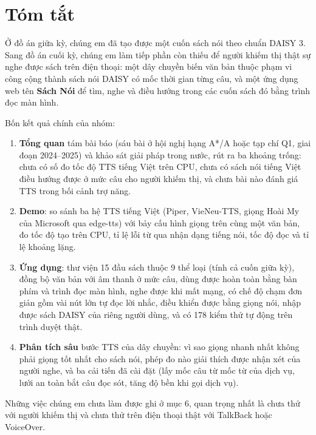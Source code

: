 \documentclass[12pt,a4paper]{article}
\providecommand{\tightlist}{\setlength{\itemsep}{2pt}\setlength{\parskip}{0pt}}
\begin{document}
\section*{Tóm tắt}

Ở đồ án giữa kỳ, chúng em đã tạo được một cuốn sách nói theo chuẩn DAISY 3. Sang đồ án cuối kỳ, chúng em làm tiếp phần còn thiếu để người khiếm thị thật sự nghe được sách trên điện thoại: một dây chuyền biến văn bản thuộc phạm vi công cộng thành sách nói DAISY có mốc thời gian từng câu, và một ứng dụng web tên \textbf{Sách Nói} để tìm, nghe và điều hướng trong các cuốn sách đó bằng trình đọc màn hình.

Bốn kết quả chính của nhóm:

\begin{enumerate}
\def\labelenumi{\arabic{enumi}.}
\tightlist
\item
  \textbf{Tổng quan} tám bài báo (sáu bài ở hội nghị hạng A*/A hoặc tạp chí Q1, giai đoạn 2024--2025) và khảo sát giải pháp trong nước, rút ra ba khoảng trống: chưa có số đo tốc độ TTS tiếng Việt trên CPU, chưa có sách nói tiếng Việt điều hướng được ở mức câu cho người khiếm thị, và chưa bài nào đánh giá TTS trong bối cảnh trợ năng.
\item
  \textbf{Demo}: so sánh ba hệ TTS tiếng Việt (Piper, VieNeu-TTS, giọng Hoài My của Microsoft qua edge-tts) với bảy cấu hình giọng trên cùng một văn bản, đo tốc độ tạo trên CPU, tỉ lệ lỗi từ qua nhận dạng tiếng nói, tốc độ đọc và tỉ lệ khoảng lặng.
\item
  \textbf{Ứng dụng}: thư viện 15 đầu sách thuộc 9 thể loại (tính cả cuốn giữa kỳ), đồng bộ văn bản với âm thanh ở mức câu, dùng được hoàn toàn bằng bàn phím và trình đọc màn hình, nghe được khi mất mạng, có chế độ chạm đơn giản gồm vài nút lớn tự đọc lời nhắc, điều khiển được bằng giọng nói, nhập được sách DAISY của riêng người dùng, và có 178 kiểm thử tự động trên trình duyệt thật.
\item
  \textbf{Phân tích sâu} bước TTS của dây chuyền: vì sao giọng nhanh nhất không phải giọng tốt nhất cho sách nói, phép đo nào giải thích được nhận xét của người nghe, và ba cải tiến đã cài đặt (lấy mốc câu từ mốc từ của dịch vụ, lưới an toàn bắt câu đọc sót, tăng độ bền khi gọi dịch vụ).
\end{enumerate}

Những việc chúng em chưa làm được ghi ở mục 6, quan trọng nhất là chưa thử với người khiếm thị và chưa thử trên điện thoại thật với TalkBack hoặc VoiceOver.

\newpage
\tableofcontents
\newpage
\end{document}
